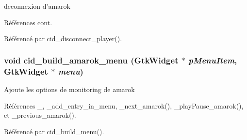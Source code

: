 deconnexion d'amarok 

Références cont.

Référencé par cid\_\-disconnect\_\-player().
\subsubsection{\setlength{\rightskip}{0pt plus 5cm}void cid\_\-build\_\-amarok\_\-menu (GtkWidget $\ast$ {\em pMenuItem}, \/  GtkWidget $\ast$ {\em menu})}\label{cid-amarok_8h_b0c12baf7e61e7e99cca31549b7e1838}


Ajoute les options de monitoring de amarok 

Références \_\-, \_\-add\_\-entry\_\-in\_\-menu, \_\-next\_\-amarok(), \_\-playPause\_\-amarok(), et \_\-previous\_\-amarok().

Référencé par cid\_\-build\_\-menu().